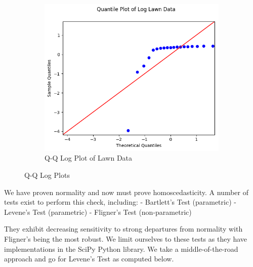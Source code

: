 \documentclass{report}
\begin{document}
\begin{figure}[H]
\begin{subfigure}[h]{0.4\textwidth}
	\end{subfigure}
	~
	\begin{subfigure}[h]{0.4\textwidth}
		\centering
		\includegraphics[width=\textwidth]{images/lawn_log_qq}
		\caption{Q-Q Log Plot of Lawn Data}
		\label{fig:qqloglawn}
	\end{subfigure}
	\caption{Q-Q Log Plots}
	\label{fig:qqlogplot}
\end{figure}

We have proven normality and now must prove homoscedasticity. A number of tests exist to perform this check, including: - Bartlett's Test (parametric) - Levene's Test (parametric) - Fligner's Test (non-parametric)

They exhibit decreasing sensitivity to strong departures from normality with Fligner's being the most robust. We limit ourselves to these tests as they have implementations in the SciPy Python library. We take a middle-of-the-road approach and go for Levene's Test as computed below.
\end{document}
